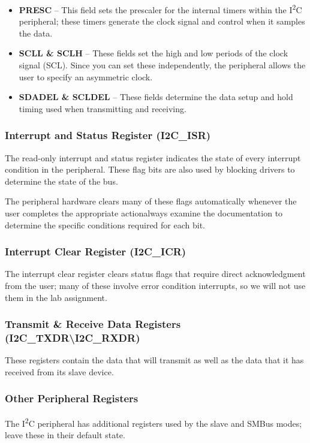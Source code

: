 \documentclass[openany,11pt,fleqn]{book} %
\begin{document}
    \begin{itemize}
        \item \textbf{PRESC} -- This field sets the prescaler for the internal timers within the I\textsuperscript{2}C peripheral; these timers generate the clock signal and control when it samples the data.  
        \item \textbf{SCLL \& SCLH} -- These fields set the high and low periods of the clock signal (SCL). Since you can set these independently, the peripheral allows the user to specify an asymmetric clock. 
        \item \textbf{SDADEL \& SCLDEL} -- These fields determine the data setup and hold timing used when transmitting and receiving. 
    \end{itemize}

    \subsubsection{Interrupt and Status Register (I2C\_ISR)}
    The read-only interrupt and status register indicates the state of every interrupt condition in the peripheral. These flag bits are also used by blocking drivers to determine the state of the bus.
    
    \begin{warning}
	    The peripheral hardware clears many of these flags automatically whenever the user completes the appropriate action\textemdash always examine the documentation to determine the specific conditions required for each bit. 
	\end{warning}

    \subsubsection{Interrupt Clear Register (I2C\_ICR)}
    The interrupt clear register clears status flags that require direct acknowledgment from the user; many of these involve error condition interrupts, so we will not use them in the lab assignment.
    
    \subsubsection{Transmit \& Receive Data Registers (I2C\_TXDR{\textbackslash}I2C\_RXDR)}
    These registers contain the data that will transmit as well as the data that it has received from its slave device. 
    
    \subsubsection{Other Peripheral Registers}
    The I\textsuperscript{2}C peripheral has additional registers used by the slave and SMBus modes; leave these in their default state.
\end{document}
